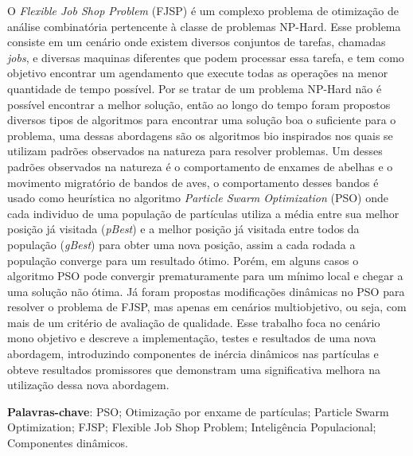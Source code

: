 \par

\begin{resumo}
    O \textit{Flexible Job Shop Problem} (FJSP) é um complexo problema de otimização de análise combinatória pertencente à classe de problemas NP-Hard. Esse problema consiste em um cenário onde existem diversos conjuntos de tarefas, chamadas \textit{jobs}, e diversas maquinas diferentes que podem processar essa tarefa, e tem como objetivo encontrar um agendamento que execute todas as operações na menor quantidade de tempo possível. Por se tratar de um problema NP-Hard não é possível encontrar a melhor solução, então ao longo do tempo foram propostos diversos tipos de algoritmos para encontrar uma solução boa o suficiente para o problema, uma dessas abordagens são os algoritmos bio inspirados nos quais se utilizam padrões observados na natureza para resolver problemas. Um desses padrões observados na natureza é o comportamento de enxames de abelhas e o movimento migratório de bandos de aves, o comportamento desses bandos é usado como heurística no algoritmo \textit{Particle Swarm Optimization} (PSO) onde cada individuo de uma população de partículas utiliza a média entre sua melhor posição já visitada (\textit{pBest}) e a melhor posição já visitada entre todos da população (\textit{gBest}) para obter uma nova posição, assim a cada rodada a população converge para um resultado ótimo. Porém, em alguns casos o algoritmo PSO pode convergir prematuramente para um mínimo local e chegar a uma solução não ótima. Já foram propostas modificações dinâmicas no PSO para resolver o problema de FJSP, mas apenas em cenários multiobjetivo, ou seja, com mais de um critério de avaliação de qualidade. Esse trabalho foca no cenário mono objetivo e descreve a implementação, testes e resultados de uma nova abordagem, introduzindo componentes de inércia dinâmicos nas partículas e obteve resultados promissores que demonstram uma significativa melhora na utilização dessa nova abordagem.\vspace{\onelineskip}

\noindent\textbf{Palavras-chave}: PSO; Otimização por enxame de partículas; Particle Swarm Optimization; FJSP; Flexible Job Shop Problem; Inteligência Populacional; Componentes dinâmicos.
\end{resumo}

